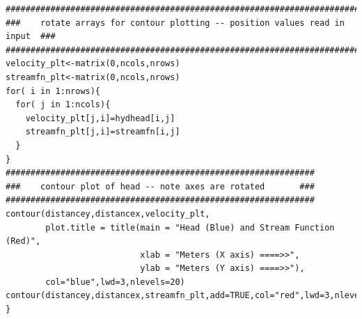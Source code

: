\begin{lstlisting}[caption= Contour plotting script , label=lst:2DinclusionPlot]
###############################################################################
###    rotate arrays for contour plotting -- position values read in input  ###
###############################################################################
velocity_plt<-matrix(0,ncols,nrows) 
streamfn_plt<-matrix(0,ncols,nrows) 
for( i in 1:nrows){
  for( j in 1:ncols){
    velocity_plt[j,i]=hydhead[i,j]
    streamfn_plt[j,i]=streamfn[i,j]
  }
}
##############################################################
###    contour plot of head -- note axes are rotated       ###
##############################################################
contour(distancey,distancex,velocity_plt,
        plot.title = title(main = "Head (Blue) and Stream Function (Red)",
                           xlab = "Meters (X axis) ====>>", 
                           ylab = "Meters (Y axis) ====>>"),
        col="blue",lwd=3,nlevels=20)
contour(distancey,distancex,streamfn_plt,add=TRUE,col="red",lwd=3,nlevels=20)
}\end{lstlisting}

